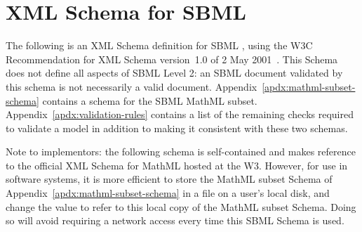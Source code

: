 
\section{XML Schema for SBML}
\label{apdx:schema}

The following is an XML Schema definition for SBML \thisLV, using
the W3C Recommendation for XML Schema version~1.0 of 2 May
2001~\citep{biron:2000,fallside:2000,thompson:2000}.  This Schema
does not define all aspects of SBML Level 2: an SBML document
validated by this schema is not necessarily a valid \sbmltwo
document.  Appendix~\ref{apdx:mathml-subset-schema} contains a
schema for the SBML MathML subset.
Appendix~\ref{apdx:validation-rules} contains a list of the
remaining checks required to validate a model in addition
to making it consistent with these two schemas.

Note to implementors: the following schema is
self-contained and makes reference to the official XML Schema for
MathML hosted at the W3.  However, for use in software systems, it
is more efficient to store the MathML subset Schema of
Appendix~\ref{apdx:mathml-subset-schema} in a file on a user's
local disk, and change the  value
 
to refer to this local copy of the MathML subset Schema.
Doing so will avoid requiring a network access every time this
SBML Schema is used.

\tightspacing
\begin{alltt}
\begin{footnotesize}

\end{footnotesize}
\end{alltt}
\regularspacing
